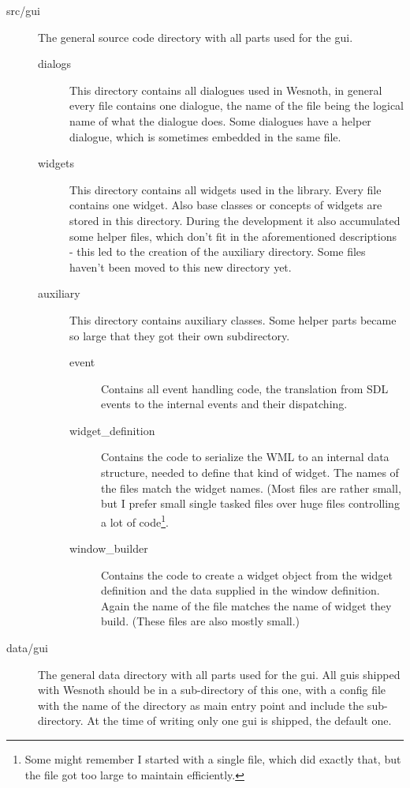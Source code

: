 \begin{description}
\item[src/gui] The general source code directory with all parts used for the gui.

\begin{description}
\item[dialogs] This directory contains all dialogues used in Wesnoth, in
	general every file contains one dialogue, the name of the file being the
	logical name of what the dialogue does. Some dialogues have a helper
	dialogue, which is sometimes embedded in the same file.
\item[widgets] This directory contains all widgets used in the library. Every
	file contains one widget. Also base classes or concepts of widgets are
	stored in this directory. During the development it also accumulated some
	helper files, which don't fit in the aforementioned descriptions - this led
	to the creation of the auxiliary directory. Some files haven't been moved to
	this new directory yet.
\item[auxiliary] This directory contains auxiliary classes. Some helper
	parts became so large that they got their own subdirectory.

\begin{description}
\item[event] Contains all event handling code, the translation from SDL events
	to the internal events and their dispatching.
\item[widget\_definition] Contains the code to serialize the WML to an internal
	data structure, needed to define that kind of widget. The names of the files
	match the widget names. (Most files are rather small, but I prefer small
	single tasked files over huge files controlling a lot of code\footnote{Some
	might remember I started with a single file, which did exactly that, but the
	file got too large to maintain efficiently.}.
\item[window\_builder] Contains the code to create a widget object from the
	widget definition and the data supplied in the window definition. Again the
	name of the file matches the name of widget they build. (These files are
	also mostly small.)
\end{description}

\end{description}

\item[data/gui] The general data directory with all parts used for the gui. All
	guis shipped with Wesnoth should be in a sub-directory of this one, with a
	config file with the name of the directory as main entry point and include
	the sub-directory. At the time of writing only one gui is shipped, the
	default one.


\end{description}
